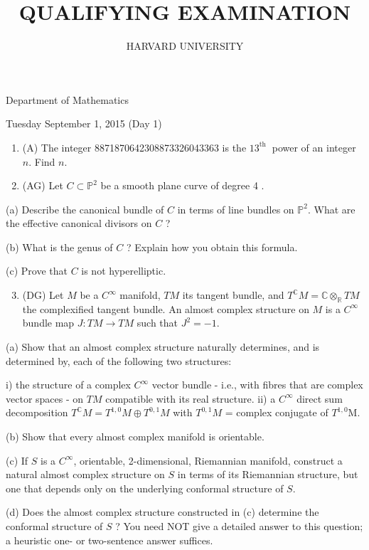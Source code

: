 \documentclass[10pt]{article}
\title{QUALIFYING EXAMINATION }
\author{HARVARD UNIVERSITY}
\date{}
\begin{document}
\maketitle
Department of Mathematics

Tuesday September 1, 2015 (Day 1)

\begin{enumerate}
  \item (A) The integer 8871870642308873326043363 is the $13^{\text {th }}$ power of an integer $n$. Find $n$.

  \item (AG) Let $C \subset \mathbb{P}^{2}$ be a smooth plane curve of degree 4 .

\end{enumerate}

(a) Describe the canonical bundle of $C$ in terms of line bundles on $\mathbb{P}^{2}$. What are the effective canonical divisors on $C$ ?

(b) What is the genus of $C$ ? Explain how you obtain this formula.

(c) Prove that $C$ is not hyperelliptic.

\begin{enumerate}
  \setcounter{enumi}{2}
  \item (DG) Let $M$ be a $C^{\infty}$ manifold, $T M$ its tangent bundle, and $T^{\mathbb{C}} M=\mathbb{C} \otimes_{\mathbb{R}} T M$ the complexified tangent bundle. An almost complex structure on $M$ is a $C^{\infty}$ bundle map $J: T M \rightarrow T M$ such that $J^{2}=-1$.
\end{enumerate}

(a) Show that an almost complex structure naturally determines, and is determined by, each of the following two structures:

i) the structure of a complex $C^{\infty}$ vector bundle - i.e., with fibres that are complex vector spaces - on $T M$ compatible with its real structure. ii) a $C^{\infty}$ direct sum decomposition $T^{\mathbb{C}} M=T^{1,0} M \oplus T^{0,1} M$ with $T^{0,1} M$ = complex conjugate of $T^{1,0} \mathrm{M}$.

(b) Show that every almost complex manifold is orientable.

(c) If $S$ is a $C^{\infty}$, orientable, 2-dimensional, Riemannian manifold, construct a natural almost complex structure on $S$ in terms of its Riemannian structure, but one that depends only on the underlying conformal structure of $S$.

(d) Does the almost complex structure constructed in (c) determine the conformal structure of $S$ ? You need NOT give a detailed answer to this question; a heuristic one- or two-sentence answer suffices.
\end{document}

